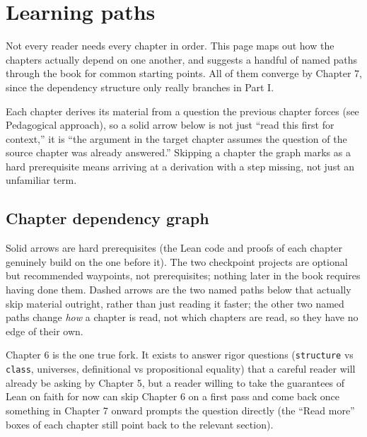 \chapter*{Learning paths}
\setcounter{section}{0}\label{sec:root:learning-paths:1}

Not every reader needs every chapter in order. This page maps out how the chapters actually depend on one another, and suggests a handful of named paths through the book for common starting points. All of them converge by Chapter 7, since the dependency structure only really branches in Part I.

Each chapter derives its material from a question the previous chapter forces (see Pedagogical approach), so a solid arrow below is not just ``read this first for context,'' it is ``the argument in the target chapter assumes the question of the source chapter was already answered.'' Skipping a chapter the graph marks as a hard prerequisite means arriving at a derivation with a step missing, not just an unfamiliar term.

\section*{Chapter dependency graph}
\label{sec:root:learning-paths:2}

\begin{center}

\end{center}

Solid arrows are hard prerequisites (the Lean code and proofs of each chapter genuinely build on the one before it). The two checkpoint projects are optional but recommended waypoints, not prerequisites; nothing later in the book requires having done them. Dashed arrows are the two named paths below that actually skip material outright, rather than just reading it faster; the other two named paths change \emph{how} a chapter is read, not which chapters are read, so they have no edge of their own.

Chapter 6 is the one true fork. It exists to answer rigor questions (\texttt{structure} vs \texttt{class}, universes, definitional vs propositional equality) that a careful reader will already be asking by Chapter 5, but a reader willing to take the guarantees of Lean on faith for now can skip Chapter 6 on a first pass and come back once something in Chapter 7 onward prompts the question directly (the ``Read more'' boxes of each chapter still point back to the relevant section).

